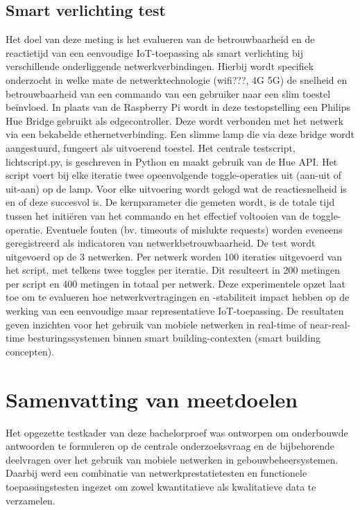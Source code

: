 \subsection{Smart verlichting test}
Het doel van deze meting is het evalueren van de betrouwbaarheid en de reactietijd van een eenvoudige IoT-toepassing als smart verlichting bij verschillende onderliggende netwerkverbindingen.
Hierbij wordt specifiek onderzocht in welke mate de netwerktechnologie (wifi???, 4G 5G) de snelheid en betrouwbaarheid van een commando van een gebruiker naar een slim toestel beïnvloed.
In plaats van de Raspberry Pi wordt in deze testopstelling een Philips Hue Bridge gebruikt als edgecontroller. Deze wordt verbonden met het netwerk via een bekabelde ethernetverbinding. Een slimme lamp die via deze bridge wordt aangestuurd, fungeert als uitvoerend toestel.
Het centrale testscript, lichtscript.py, is geschreven in Python en maakt gebruik van de Hue API. Het script voert bij elke iteratie twee opeenvolgende toggle-operaties uit (aan-uit of uit-aan) op de lamp. Voor elke uitvoering wordt gelogd wat de reactiesnelheid is en of deze succesvol is.
De kernparameter die gemeten wordt, is de totale tijd tussen het initiëren van het commando en het effectief voltooien van de toggle-operatie. Eventuele fouten (bv. timeouts of mislukte requests) worden eveneens geregistreerd als indicatoren van netwerkbetrouwbaarheid.
De test wordt uitgevoerd op de 3 netwerken. Per netwerk worden 100 iteraties uitgevoerd van het script, met telkens twee toggles per iteratie. Dit resulteert in 200 metingen per script en 400 metingen in totaal per netwerk.
Deze experimentele opzet laat toe om te evalueren hoe netwerkvertragingen en -stabiliteit impact hebben op de werking van een eenvoudige maar representatieve IoT-toepassing. De resultaten geven inzichten voor het gebruik van mobiele netwerken in real-time of near-real-time besturingssystemen binnen smart building-contexten (smart building concepten).


\section{Samenvatting van meetdoelen}

Het opgezette testkader van deze bachelorproef was ontworpen om onderbouwde antwoorden te formuleren op de centrale onderzoeksvraag en de bijbehorende deelvragen over het gebruik van mobiele netwerken in gebouwbeheersystemen. Daarbij werd een combinatie van netwerkprestatietesten en functionele toepassingstesten ingezet om zowel kwantitatieve als kwalitatieve data te verzamelen.


